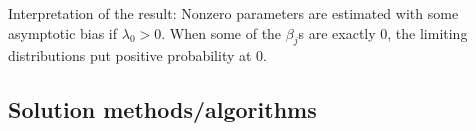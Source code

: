 \documentclass{article}
\theoremstyle{definition}
\DeclareMathOperator*{\argmin}{arg\,min}
\begin{document}
%


Interpretation of the result: Nonzero parameters are estimated with some asymptotic bias if $\lambda_0 > 0$. When some of the $\beta_j$s are exactly $0$, the limiting distributions put positive probability at $0$. 

\subsection{Solution methods/algorithms}
\end{document}
